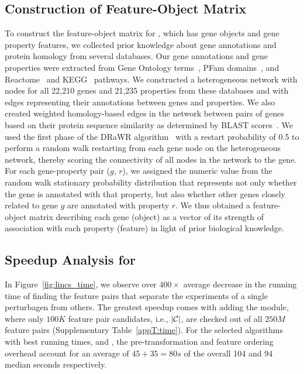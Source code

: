 \subsection{Construction of \msig Feature-Object Matrix} \label{app:msig_matrix}
To construct the feature-object matrix for \msig, which has gene objects and gene property features, we collected prior knowledge about gene annotations and protein homology from several databases.
Our gene annotations and gene properties were extracted from Gene Ontology terms~,
PFam domains~, and Reactome~  and KEGG~ pathways.
We constructed a heterogeneous  network with nodes for all 22,210 genes and 21,235 properties from these databases and with edges representing their annotations between genes and properties.
We also created weighted homology-based edges in the network between pairs of genes based on their protein sequence similarity as determined by BLAST scores~.
We used the first phase of the DRaWR algorithm~ with a restart probability of 0.5 to perform a random walk restarting from each gene node on the heterogeneous network, thereby scoring the connectivity of all nodes in the network to the gene.
For each gene-property pair ($g$, $r$), we assigned the numeric value from the random walk stationary probability distribution that represents not only whether the gene is annotated with that property, but also whether other genes closely related to gene $g$ are annotated with property $r$.
We thus obtained a feature-object matrix describing each gene (object) as a vector of its strength of association with each property (feature) in light of prior biological knowledge.


\subsection{Speedup Analysis for \lincs} \label{app:lincs}
In Figure~\ref{fig:lincs_time}, we observe over $400\times$ average decrease in the running time of finding the \topk feature pairs that separate the \lincs experiments of a single perturbagen from others. The greatest speedup comes with adding the \sampling module, where only $100K$ feature pair candidates, i.e., $|{\mathcal{C}}|$, are checked out of all $250M$ feature pairs (Supplementary Table~\ref{appT:time}). For the selected algorithms with best running times, \horiz and \vertic, the pre-transformation and feature ordering overhead account for an average of $45+35=80s$ of the overall 104 and 94 median seconds respectively.


